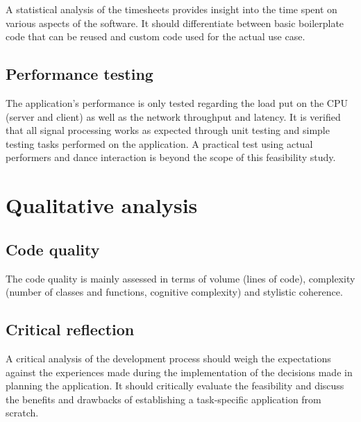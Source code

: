 A statistical analysis of the timesheets provides insight into the time spent on various aspects of the software. It should differentiate between basic boilerplate code that can be reused and custom code used for the actual use case.

\subsection{Performance testing}

The application's performance is only tested regarding the load put on the \ac{CPU} (server and client) as well as the network throughput and latency. It is verified that all signal processing works as expected through unit testing and simple testing tasks performed on the application. A practical test using actual performers and dance interaction is beyond the scope of this feasibility study.

\section{Qualitative analysis}

\subsection{Code quality}

The code quality is mainly assessed in terms of volume (lines of code), complexity (number of classes and functions, cognitive complexity) and stylistic coherence.

\subsection{Critical reflection}

A critical analysis of the development process should weigh the expectations against the experiences made during the implementation of the decisions made in planning the application. It should critically evaluate the feasibility and discuss the benefits and drawbacks of establishing a task-specific application from scratch.
